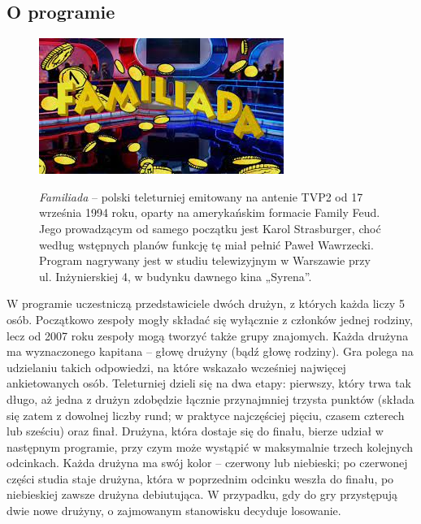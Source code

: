 \documentclass{article}
\begin{document}
\subsection{O programie}
\begin{figure}[htp]
\begin{minipage}{0.33\textwidth}
\centering
\includegraphics[width=\textwidth]{foto2.jpg}
\end{minipage}
\begin{minipage}{0.66\textwidth}
\centering
\textit{Familiada} – polski teleturniej emitowany na antenie TVP2 od 17 września 1994 roku, oparty na amerykańskim formacie Family Feud. 
Jego prowadzącym od samego początku jest Karol Strasburger, choć według wstępnych planów funkcję tę miał pełnić Paweł Wawrzecki. Program 
nagrywany jest w studiu telewizyjnym w Warszawie przy ul. Inżynierskiej 4, w budynku dawnego kina „Syrena”.
\end{minipage}
\end{figure}
W programie uczestniczą przedstawiciele dwóch drużyn, z których każda liczy 5 osób. Początkowo zespoły mogły składać się wyłącznie z 
członków jednej rodziny, lecz od 2007 roku zespoły mogą tworzyć także grupy znajomych. Każda drużyna ma wyznaczonego kapitana – głowę 
drużyny (bądź głowę rodziny). Gra polega na udzielaniu takich odpowiedzi, na które wskazało wcześniej najwięcej ankietowanych osób. 
Teleturniej dzieli się na dwa etapy: pierwszy, który trwa tak długo, aż jedna z drużyn zdobędzie łącznie przynajmniej trzysta punktów 
(składa się zatem z dowolnej liczby rund; w praktyce najczęściej pięciu, czasem czterech lub sześciu) oraz finał. Drużyna, która dostaje 
się do finału, bierze udział w następnym programie, przy czym może wystąpić w maksymalnie trzech kolejnych odcinkach. Każda drużyna ma 
swój kolor – czerwony lub niebieski; po czerwonej części studia staje drużyna, która w poprzednim odcinku weszła do finału, po 
niebieskiej zawsze drużyna debiutująca. W przypadku, gdy do gry przystępują dwie nowe drużyny, o zajmowanym stanowisku decyduje 
losowanie.
\end{document}
